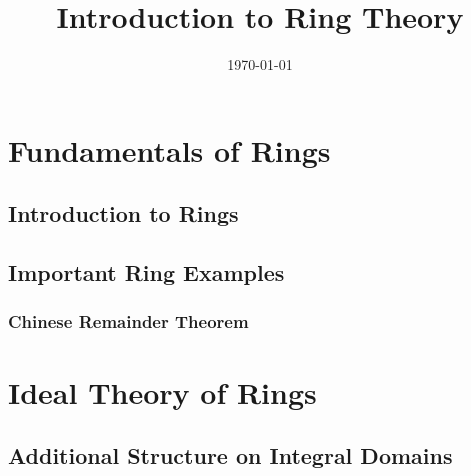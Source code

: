 \documentclass{memoir}
\institute{Rice University}
\title{Introduction to Ring Theory}
\date{\today}
\begin{document}
\maketitle


\chapter{Fundamentals of Rings}
\label{cha:fundamentals_of_rings}

\section{Introduction to Rings}
\label{sec:introduction_to_rings}







\section{Important Ring Examples}
\label{sec:important_ring_examples}




\subsection{Chinese Remainder Theorem}
\label{sub:chinese_remainder_theorem}



\chapter{Ideal Theory of Rings}
\label{cha:ideal_theory_of_rings}

\section{Additional Structure on Integral Domains}
\label{sec:additional_structure_on_integral_domains}


\end{document}

